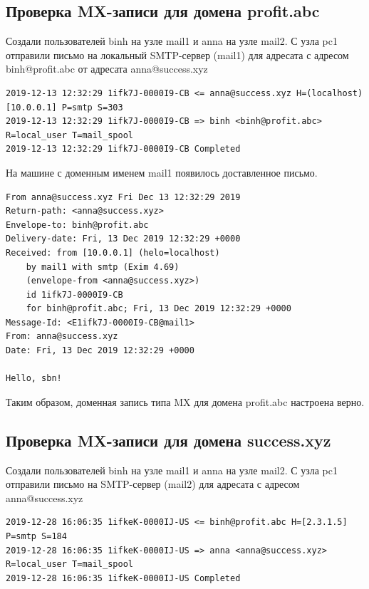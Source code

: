 \documentclass[a4paper,12pt]{article}
\begin{document}
\subsection{Проверка MX-записи для домена profit.abc}

Создали пользователей binh на узле mail1 и anna на узле mail2.
С узла pc1 отправили письмо на локальный SMTP-сервер (mail1) для адресата с адресом binh@profit.abc от адресата anna@success.xyz

\begin{verbatim}
2019-12-13 12:32:29 1ifk7J-0000I9-CB <= anna@success.xyz H=(localhost) [10.0.0.1] P=smtp S=303
2019-12-13 12:32:29 1ifk7J-0000I9-CB => binh <binh@profit.abc> R=local_user T=mail_spool
2019-12-13 12:32:29 1ifk7J-0000I9-CB Completed
\end{verbatim}

На машине с доменным именем mail1 появилось доставленное письмо.
\begin{verbatim}
From anna@success.xyz Fri Dec 13 12:32:29 2019
Return-path: <anna@success.xyz>
Envelope-to: binh@profit.abc
Delivery-date: Fri, 13 Dec 2019 12:32:29 +0000
Received: from [10.0.0.1] (helo=localhost)
	by mail1 with smtp (Exim 4.69)
	(envelope-from <anna@success.xyz>)
	id 1ifk7J-0000I9-CB
	for binh@profit.abc; Fri, 13 Dec 2019 12:32:29 +0000
Message-Id: <E1ifk7J-0000I9-CB@mail1>
From: anna@success.xyz
Date: Fri, 13 Dec 2019 12:32:29 +0000

Hello, sbn!
\end{verbatim}

Таким образом, доменная запись типа MX для домена profit.abc настроена верно.

\subsection{Проверка MX-записи для домена success.xyz}

Создали пользователей binh на узле mail1 и anna на узле mail2.
С узла pc1 отправили письмо на SMTP-сервер (mail2) для адресата с адресом anna@success.xyz

\begin{verbatim}
2019-12-28 16:06:35 1ifkeK-0000IJ-US <= binh@profit.abc H=[2.3.1.5] P=smtp S=184
2019-12-28 16:06:35 1ifkeK-0000IJ-US => anna <anna@success.xyz> R=local_user T=mail_spool
2019-12-28 16:06:35 1ifkeK-0000IJ-US Completed
\end{verbatim}
\end{document}
